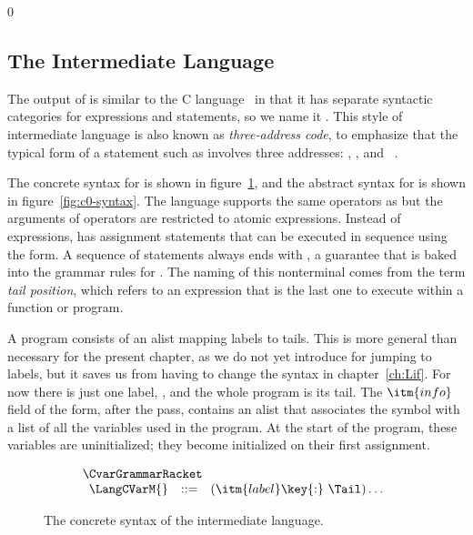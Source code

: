 \documentclass[7x10]{TimesAPriori_MIT}%
\def\racketEd{0}
\providecommand{\BookEdition}{1}
\let\edition\BookEdition
\numberwithin{theorem}{chapter}
\numberwithin{definition}{chapter}
\numberwithin{equation}{chapter}
\begin{document}
{\if\edition\racketEd  
\subsection{The \LangCVar{} Intermediate Language}

The output of  is similar to the C
language~\citep{Kernighan:1988nx} in that it has separate syntactic
categories for expressions and statements, so we name it \LangCVar{}.
This style of intermediate language is also known as
\emph{three-address code}, to emphasize that the typical form of a
statement such as  involves three
addresses: , , and ~\citep{Aho:2006wb}.

The concrete syntax for \LangCVar{} is shown in
figure~\ref{fig:c0-concrete-syntax}, and the abstract syntax for
\LangCVar{} is shown in figure~\ref{fig:c0-syntax}.
%
The \LangCVar{} language supports the same operators as \LangVar{} but
the arguments of operators are restricted to atomic
expressions. Instead of  expressions, \LangCVar{} has
assignment statements that can be executed in sequence using the
 form. A sequence of statements always ends with
, a guarantee that is baked into the grammar rules for
. The naming of this nonterminal comes from the term
\emph{tail position}, which refers to an
expression that is the last one to execute within a function or
program.

A \LangCVar{} program consists of an alist mapping labels to
tails. This is more general than necessary for the present chapter, as
we do not yet introduce  for jumping to labels, but it saves
us from having to change the syntax in chapter~\ref{ch:Lif}.  For now
there is just one label, , and the whole program is
its tail.
%
The $\itm{info}$ field of the  form, after the
 pass, contains an alist that associates the
symbol  with a list of all the variables used in the
program. At the start of the program, these variables are
uninitialized; they become initialized on their first assignment.

\begin{figure}[tbp]
\begin{tcolorbox}[colback=white]
\[
\begin{array}{l}
  \CvarGrammarRacket \\
\begin{array}{lcl}
\LangCVarM{} & ::= & (\itm{label}\key{:}~ \Tail)\ldots
\end{array}
\end{array}
\]
\end{tcolorbox}
\caption{The concrete syntax of the \LangCVar{} intermediate language.}
\label{fig:c0-concrete-syntax}
\end{figure}


}
\end{document}

